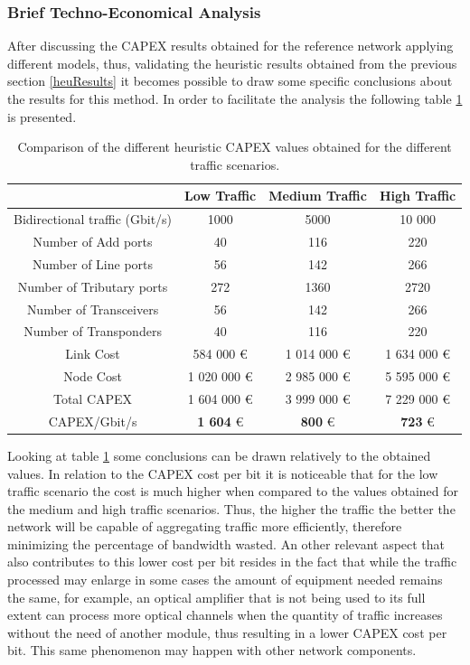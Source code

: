 \subsubsection{Brief Techno-Economical Analysis}

After discussing the CAPEX results obtained for the reference network applying different models, thus, validating the heuristic results obtained from the previous section \ref{heuResults} it becomes possible to draw some specific conclusions about the results for this method. In order to facilitate the analysis the following table \ref{comparacao} is presented.
\vspace{15pt}
\begin{table}[H]
\centering
\begin{tabular}{|c|c|c|c|}
\hline
 & \textbf{Low Traffic} & \textbf{Medium Traffic} & \textbf{High Traffic} \\ \hline
Bidirectional traffic (Gbit/s) & 1000 & 5000 & 10 000 \\ \hline
Number of Add ports & 40 & 116 & 220 \\ \hline
Number of Line ports & 56 & 142 & 266 \\ \hline
Number of Tributary ports & 272 & 1360 & 2720 \\ \hline
Number of Transceivers & 56 & 142 & 266 \\ \hline
Number of Transponders & 40 & 116 & 220 \\ \hline
Link Cost & 584 000 \euro & 1 014 000 \euro & 1 634 000 \euro \\ \hline
Node Cost & 1 020 000 \euro & 2 985 000 \euro & 5 595 000 \euro \\ \hline
Total CAPEX & 1 604 000 \euro & 3 999 000 \euro & 7 229 000 \euro \\ \hline
CAPEX/Gbit/s & \textbf{1 604} \euro & \textbf{800} \euro & \textbf{723} \euro \\ \hline
\end{tabular}
\caption{Comparison of the different heuristic CAPEX values obtained for the different traffic scenarios.}
\label{comparacao}
\end{table}
\vspace{11pt}
Looking at table \ref{comparacao} some conclusions can be drawn relatively to the obtained values. In relation to the CAPEX cost per bit it is noticeable that for the low traffic scenario the cost is much higher when compared to the values obtained for the medium and high traffic scenarios. Thus, the higher the traffic the better the network will be capable of aggregating traffic more efficiently, therefore minimizing the percentage of bandwidth wasted. An other relevant aspect that also contributes to this lower cost per bit resides in the fact that while the traffic processed may enlarge in some cases the amount of equipment needed remains the same, for example, an optical amplifier that is not being used to its full extent can process more optical channels when the quantity of traffic increases without the need of another module, thus resulting in a lower CAPEX cost per bit. This same phenomenon may happen with other network components.


